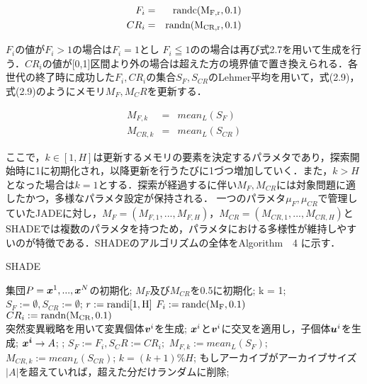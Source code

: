 \documentclass[a4paper,11pt,oneside,openany]{jsbook}
\def\vector#1{\mbox{\boldmath $#1$}}
\begin{document}
\begin{eqnarray}
  F_i & = & \rm{randc}(M_{F,r}, 0.1) \\
  CR_i & = & \rm{randn}(M_{CR,r}, 0.1)
\end{eqnarray}

$F_i$の値が$F_i>1$の場合は$F_i = 1$とし $F_i\leqq1の$の場合は再び式2.7を用いて生成を行う．$CR_i$の値が[0,1]区間より外の場合は超えた方の境界値で置き換えられる．各世代の終了時に成功した$F_i,CR_i$の集合$S_F,S_{CR}$のLehmer平均を用いて，式(2.9)，式(2.9)のようにメモリ$M_F,M_CR$を更新する．

\begin{eqnarray}
  M_{F,k} & = & mean_L(S_F)\\
  M_{CR,k} & = & mean_L(S_{CR})
\end{eqnarray}

ここで，$k \in [1,H]$は更新するメモリの要素を決定するパラメタであり，探索開始時に1に初期化され，以降更新を行うたびに1づつ増加していく．また，$k > H$となった場合は$k = 1$とする．探索が経過するに伴い$M_F,M_{CR}$には対象問題に適したかつ，多様なパラメタ設定が保持される．
一つのパラメタ$\mu _F, \mu _{CR}$で管理していたJADEに対し，$M_F = (M_{F,1},...,M_{F,H})$，$M_{CR}= (M_{CR,1},...,M_{CR,H})$とSHADEでは複数のパラメタを持つため，パラメタにおける多様性が維持しやすいのが特徴である．SHADEのアルゴリズムの全体をAlgorithm　4 に示す．

\newpage
\begin{algorithm}
\caption{SHADE}
\label{alg:pbnf}
\begin{algorithmic}
\STATE 集団$P={\vector{x}^1,...,\vector{x}^N}$の初期化;
\STATE $M _F$及び$M _{CR}$を0.5に初期化;
\STATE k = 1;
    \STATE $S_F := \emptyset, S_{CR} := \emptyset$;
        \STATE $r := \rm{randi}[1,H]$
        \STATE $F_i := \rm{randc}(M_F, 0.1)$ \\
        \STATE $CR_i := \rm{randn}(M_{CR}, 0.1)$ \\
        \STATE 突然変異戦略を用いて変異個体{$\vector{v}^i$}を生成;
        \STATE $\vector{x}^i$と$\vector{v}^i$に交叉を適用し，子個体$\vector{u}^i$を生成;
     \ENDFOR
        \IF {$f(\vector{u}^i) \leqq f(\vector{x}^i)$}
            \STATE $\vector{x^i} \rightarrow {A}$;
            \STATE {$\vector{x}^i := \vector{u}^i$};
            \STATE $S_F := {F_i}, S_CR := {CR_i};$
        \ENDIF
    \ENDFOR
        \STATE $M_{F,k}  :=  mean_L(S_F)$;
        \STATE $M_{CR,k}  :=  mean_L(S_{CR})$;
        \STATE $k = (k+1) \% H$;
    \ENDIF
    \STATE もしアーカイブがアーカイブサイズ$|A|$を超えていれば，超えた分だけランダムに削除;
\ENDWHILE
\end{algorithmic}
\end{algorithm}
\newpage
\end{document}
